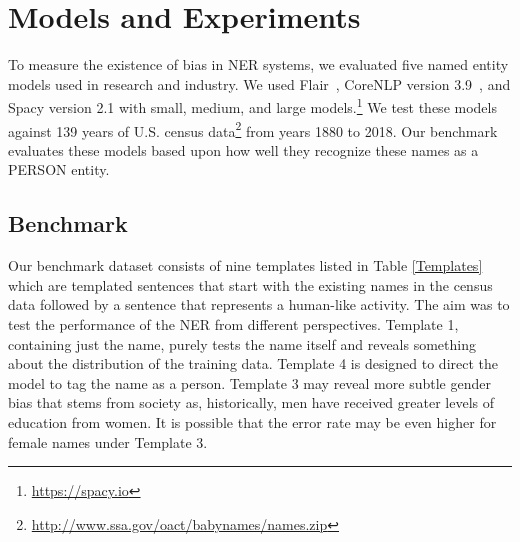 \section{Models and Experiments}
To measure the existence of bias in NER systems, we evaluated five named entity models used in research and industry. We used Flair~\cite{akbik2018coling,akbik-etal-2019-flair}, CoreNLP version 3.9~\cite{manning-EtAl:2014:P14-5,Finkel:2005:INI:1219840.1219885}, and Spacy version 2.1 with small, medium, and large models.\footnote{\small{\url{https://spacy.io}}}
We test these models against 139 years of U.S. census data\footnote{\small{\url{http://www.ssa.gov/oact/babynames/names.zip}}} from years 1880 to 2018. Our benchmark evaluates these models based upon how well they recognize these names as a PERSON entity. 
\subsection{Benchmark}
Our benchmark dataset consists of nine templates listed in Table \ref{Templates} which are templated sentences that start with the existing names in the census data followed by a sentence that represents a human-like activity. The aim was to test the performance of the NER from different perspectives. Template 1, containing just the name, purely tests the name itself and reveals something about the distribution of the training data. Template 4 is designed to direct the model to tag the name as a person. Template 3 may reveal more subtle gender bias that stems from society as, historically, men have received greater levels of education from women. It is possible that the error rate may be even higher for female names under Template 3.

